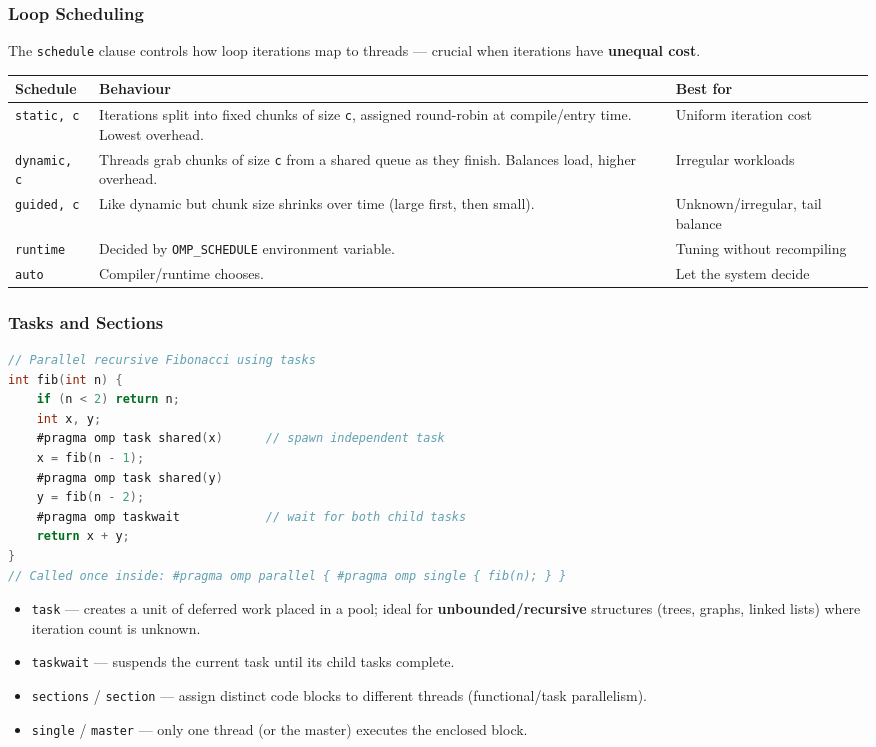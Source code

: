 \documentclass[11pt,a4paper]{article}
\begin{document}
\subsubsection{Loop Scheduling}
The \texttt{schedule} clause controls how loop iterations map to threads --- crucial when iterations have \textbf{unequal cost}.
\begin{longtable}{@{}p{3.2cm}p{6.5cm}p{3.9cm}@{}}
\toprule
\rowcolor{primary!15}
\textbf{Schedule} & \textbf{Behaviour} & \textbf{Best for} \\
\midrule
\endhead
\texttt{static, c} & Iterations split into fixed chunks of size \texttt{c}, assigned round-robin at compile/entry time. Lowest overhead. & Uniform iteration cost \\
\texttt{dynamic, c} & Threads grab chunks of size \texttt{c} from a shared queue as they finish. Balances load, higher overhead. & Irregular workloads \\
\texttt{guided, c} & Like dynamic but chunk size shrinks over time (large first, then small). & Unknown/irregular, tail balance \\
\texttt{runtime} & Decided by \texttt{OMP\_SCHEDULE} environment variable. & Tuning without recompiling \\
\texttt{auto} & Compiler/runtime chooses. & Let the system decide \\
\bottomrule
\end{longtable}

\subsubsection{Tasks and Sections}
\begin{examplebox}
\begin{lstlisting}[language=C]
// Parallel recursive Fibonacci using tasks
int fib(int n) {
    if (n < 2) return n;
    int x, y;
    #pragma omp task shared(x)      // spawn independent task
    x = fib(n - 1);
    #pragma omp task shared(y)
    y = fib(n - 2);
    #pragma omp taskwait            // wait for both child tasks
    return x + y;
}
// Called once inside: #pragma omp parallel { #pragma omp single { fib(n); } }
\end{lstlisting}
\end{examplebox}

\begin{itemize}[leftmargin=*, itemsep=2pt]
  \item \texttt{task} --- creates a unit of deferred work placed in a pool; ideal for \textbf{unbounded/recursive} structures (trees, graphs, linked lists) where iteration count is unknown.
  \item \texttt{taskwait} --- suspends the current task until its child tasks complete.
  \item \texttt{sections} / \texttt{section} --- assign distinct code blocks to different threads (functional/task parallelism).
  \item \texttt{single} / \texttt{master} --- only one thread (or the master) executes the enclosed block.
\end{itemize}
\end{document}

